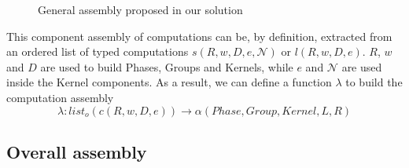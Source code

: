 \begin{figure}[h!]
\begin{center}
\caption{General assembly proposed in our solution}
\label{phgpk}
\end{center}
\end{figure}

This component assembly of computations can be, by definition, extracted from an ordered list of typed computations $s(R,w,D,e,\mathcal{N})$ or $l(R,w,D,e)$. $R$, $w$ and $D$ are used to build Phases, Groups and Kernels, while $e$ and $\mathcal{N}$ are used inside the Kernel components. As a result, we can define a function $\lambda$ to build the computation assembly
\begin{equation}
\lambda : list_o(c(R,w,D,e)) \rightarrow \alpha ({{Phase},{Group},{Kernel}},L,R)
\end{equation}

\subsection{Overall assembly}

